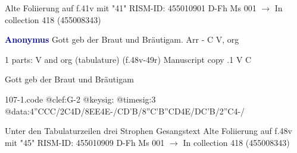 \documentclass[twocolumn]{book}
\begin{document}
\newline Alte Foliierung auf f.41v mit "41"
\newline RISM-ID: 455010901
\newline D-Fh  Ms 001
\newline $\rightarrow$ In collection 418 (455008343)
      
\newline \par \vspace{7pt} \textcolor{darkblue}{\textbf{Anonymus  }}
\newline Gott geb der Braut und Bräutigam. Arr - C
\newline V, org
\newline \begin{itshape}\end{itshape} 
\newline \textcolor{darkblue}{}  1 parts: V and org (tabulature)  (f.48v-49r)
\newline Manuscript copy
.1  V  C
\newline \begin{footnotesize} Gott geb der Braut und Bräutigam \end{footnotesize}  
\begin{filecontents*}{107-1.code}
@clef:G-2
@keysig:
@timesig:3
@data:4''CCC/2C4D/{8EE}4E-/CD'B/{8''C'B''CD}4E/DC'B/2''C4-/
\end{filecontents*}
\newline
%

\newline Unter den Tabulaturzeilen drei Strophen Gesangstext
\newline Alte Foliierung auf f.48v mit "45"
\newline RISM-ID: 455010909
\newline D-Fh  Ms 001
\newline $\rightarrow$ In collection 418 (455008343)
      
\end{document}
